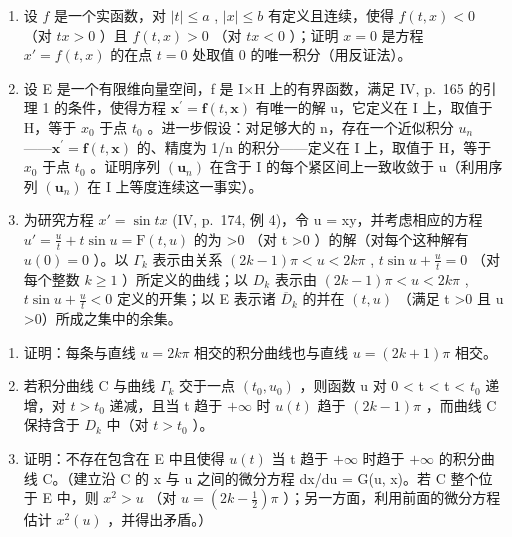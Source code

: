 \begin{enumerate}
\def\labelenumi{\arabic{enumi})}
\setcounter{enumi}{14}
\item
  设 \(f\) 是一个实函数，对 \(|t| \leqslant a\) , \(|x| \leqslant b\) 有定义且连续，使得 \(f(t,x) < 0\) （对 \(tx > 0\) ）且 \(f(t,x) > 0\) （对 \(tx < 0\) ）；证明 \(x = 0\) 是方程 \(x' = f(t,x)\) 的在点 \(t = 0\) 处取值 0 的唯一积分（用反证法）。
\item
  设 E 是一个有限维向量空间，f 是 I×H 上的有界函数，满足 IV, p.~165 的引理 1 的条件，使得方程 \(\mathbf{x}^{\prime}=\mathbf{f}(t,\mathbf{x})\) 有唯一的解 u，它定义在 I 上，取值于 H，等于 \(x_{0}\) 于点 \(t_{0}\) 。进一步假设：对足够大的 n，存在一个近似积分 \(u_{n}\) ——\(\mathbf{x}^{\prime}=\mathbf{f}(t,\mathbf{x})\) 的、精度为 1/n 的积分——定义在 I 上，取值于 H，等于 \(x_{0}\) 于点 \(t_{0}\) 。证明序列 \((\mathbf{u}_{n})\) 在含于 I 的每个紧区间上一致收敛于 u（利用序列 \((\mathbf{u}_{n})\) 在 I 上等度连续这一事实）。
\item
  为研究方程 \(x' = \sin tx\) (IV, p.~174, 例 4)，令 u = xy，并考虑相应的方程 \(u' = \frac{u}{t} + t \sin u = \mathrm{F}(t, u)\) 的为 \textgreater0 （对 t \textgreater0 ）的解（对每个这种解有 \(u(0) = 0\) ）。以 \(\Gamma_k\) 表示由关系 \((2k - 1)\pi < u < 2k\pi\) , \(t \sin u + \frac{u}{t} = 0\) （对每个整数 \(k \geqslant 1\) ）所定义的曲线；以 \(D_k\) 表示由 \((2k - 1)\pi < u < 2k\pi\) , \(t \sin u + \frac{u}{t} < 0\) 定义的开集；以 E 表示诸 \(\overline{D}_k\) 的并在 \((t, u)\) （满足 t \textgreater0 且 u \textgreater0）所成之集中的余集。
\end{enumerate}

\begin{enumerate}
\def\labelenumi{\alph{enumi})}
\item
  证明：每条与直线 \(u = 2k\pi\) 相交的积分曲线也与直线 \(u = (2k + 1)\pi\) 相交。
\item
  若积分曲线 C 与曲线 \(\Gamma_{k}\) 交于一点 \((t_{0}, u_{0})\) ，则函数 u 对 0 \textless{} t \textless{} t \textless{} \(t_{0}\) 递增，对 \(t > t_{0}\) 递减，且当 t 趋于 \(+\infty\) 时 \(u(t)\) 趋于 \((2k - 1)\pi\) ，而曲线 C 保持含于 \(D_{k}\) 中（对 \(t > t_{0}\) ）。
\item
  证明：不存在包含在 E 中且使得 \(u(t)\) 当 t 趋于 \(+\infty\) 时趋于 \(+\infty\) 的积分曲线 C。（建立沿 C 的 x 与 u 之间的微分方程 dx/du = G(u, x)。若 C 整个位于 E 中，则 \(x^{2} > u\) （对 \(u = (2k - \frac{1}{2})\pi\) ）；另一方面，利用前面的微分方程估计 \(x^{2}(u)\) ，并得出矛盾。）
\end{enumerate}

